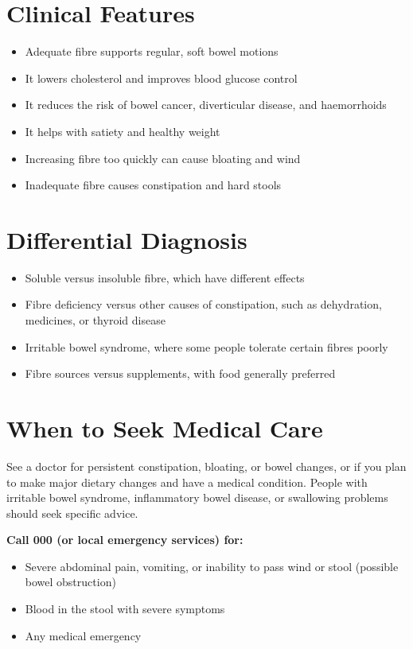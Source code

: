 \section*{Clinical Features}
\begin{itemize}
    \item Adequate fibre supports regular, soft bowel motions
    \item It lowers cholesterol and improves blood glucose control
    \item It reduces the risk of bowel cancer, diverticular disease, and haemorrhoids
    \item It helps with satiety and healthy weight
    \item Increasing fibre too quickly can cause bloating and wind
    \item Inadequate fibre causes constipation and hard stools
\end{itemize}

\section*{Differential Diagnosis}
\begin{itemize}
    \item Soluble versus insoluble fibre, which have different effects
    \item Fibre deficiency versus other causes of constipation, such as dehydration, medicines, or thyroid disease
    \item Irritable bowel syndrome, where some people tolerate certain fibres poorly
    \item Fibre sources versus supplements, with food generally preferred
\end{itemize}

\section*{When to Seek Medical Care}
See a doctor for persistent constipation, bloating, or bowel changes, or if you plan to make major dietary changes and have a medical condition. People with irritable bowel syndrome, inflammatory bowel disease, or swallowing problems should seek specific advice.

\textbf{Call 000 (or local emergency services) for:}
\begin{itemize}
    \item Severe abdominal pain, vomiting, or inability to pass wind or stool (possible bowel obstruction)
    \item Blood in the stool with severe symptoms
    \item Any medical emergency
\end{itemize}

